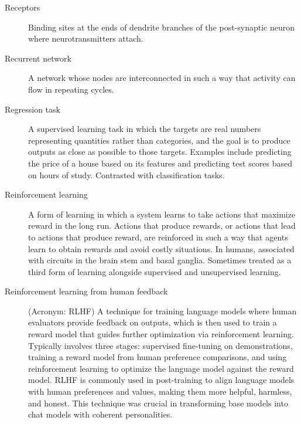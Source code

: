 \begin{description}


\item[Receptors] Binding sites at the ends of dendrite branches of the post-synaptic neuron where neurotransmitters attach.


\item[Recurrent network] A network whose nodes are interconnected in such a way that activity can flow in repeating cycles.

\item[Regression task] A supervised learning task in which the targets are real numbers representing quantities rather than categories, and the goal is to produce outputs as close as possible to those targets. Examples include predicting the price of a house based on its features and predicting test scores based on hours of study. Contrasted with classification tasks.

\item[Reinforcement learning] A form of learning in which a system learns to take actions that maximize reward in the long run.   Actions that produce rewards, or actions that lead to actions that produce reward, are reinforced in such a way that agents learn to obtain rewards and avoid costly situations.  In humans, associated with circuits in the brain stem and basal ganglia.  Sometimes treated as a third form of learning alongside supervised and unsupervised learning.

\item[Reinforcement learning from human feedback] (Acronym: RLHF) A technique for training language models where human evaluators provide feedback on outputs, which is then used to train a reward model that guides further optimization via reinforcement learning. Typically involves three stages: supervised fine-tuning on demonstrations, training a reward model from human preference comparisons, and using reinforcement learning to optimize the language model against the reward model. RLHF is commonly used in post-training to align language models with human preferences and values, making them more helpful, harmless, and honest. This technique was crucial in transforming base models into chat models with coherent personalities.


\end{description}
